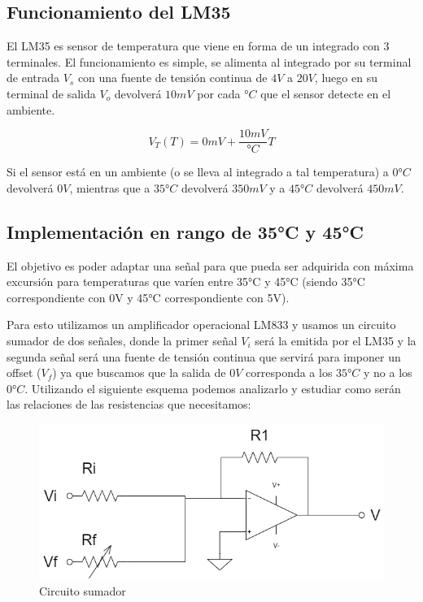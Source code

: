 \subsection{Funcionamiento del LM35}
El LM35 es sensor de temperatura que viene en forma de un integrado con 3 terminales. El funcionamiento es simple, se alimenta al integrado por su terminal de entrada $V_s$ con una fuente de tensión continua de $4V$ a $20V$, luego en su terminal de salida $V_o$ devolverá $10mV$ por cada $°C$ que el sensor detecte en el ambiente.

\begin{equation}
    V_T(T) = 0mV + \frac{10 mV}{°C} T
\end{equation}


Si el sensor está en un ambiente (o se lleva al integrado a tal temperatura) a $0°C$ devolverá $0V$, mientras que a $35°C$ devolverá $350mV$ y a $45°C$ devolverá $450mV$.



\subsection{Implementación en rango de 35°C y 45°C}

El objetivo es poder adaptar una señal para que pueda ser adquirida con máxima excursión para temperaturas que varíen entre 35°C y 45°C (siendo 35°C correspondiente con 0V y 45°C correspondiente con 5V).

Para esto utilizamos un amplificador operacional LM833 y usamos un circuito sumador de dos señales, donde la primer señal $V_i$ será la emitida por el LM35 y la segunda señal será una fuente de tensión continua que servirá para imponer un offset ($V_f$) ya que buscamos que la salida de $0V$ corresponda a los $35°C$ y no a los $0°C$. Utilizando el siguiente esquema podemos analizarlo y estudiar como serán las relaciones de las resistencias que necesitamos:

\begin{figure}[H]
    \centering
    \includegraphics[scale=0.5]{../Ejercicio4-CircuitodeAplicacion/SumLM35.png}
    \caption{Circuito sumador}
\end{figure}

